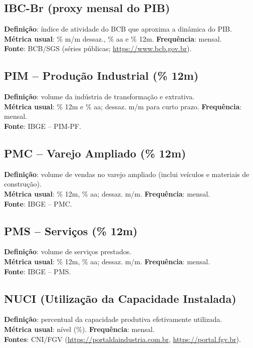 \documentclass[11pt,a4paper]{article}
\begin{document}
\subsection*{IBC-Br (proxy mensal do PIB)}
\textbf{Definição}: índice de atividade do BCB que aproxima a dinâmica do PIB.\\
\textbf{Métrica usual}: \% m/m dessaz., \% aa e \% 12m. \textbf{Frequência}: mensal.\\
\textbf{Fonte}: BCB/SGS (séries públicas; \url{https://www.bcb.gov.br}).

\subsection*{PIM -- Produção Industrial (\% 12m)}
\textbf{Definição}: volume da indústria de transformação e extrativa.\\
\textbf{Métrica usual}: \% 12m e \% aa; dessaz. m/m para curto prazo. \textbf{Frequência}: mensal.\\
\textbf{Fonte}: IBGE -- PIM-PF.

\subsection*{PMC -- Varejo Ampliado (\% 12m)}
\textbf{Definição}: volume de vendas no varejo ampliado (inclui veículos e materiais de construção).\\
\textbf{Métrica usual}: \% 12m, \% aa; dessaz. m/m. \textbf{Frequência}: mensal.\\
\textbf{Fonte}: IBGE -- PMC.

\subsection*{PMS -- Serviços (\% 12m)}
\textbf{Definição}: volume de serviços prestados.\\
\textbf{Métrica usual}: \% 12m, \% aa; dessaz. m/m. \textbf{Frequência}: mensal.\\
\textbf{Fonte}: IBGE -- PMS.

\subsection*{NUCI (Utilização da Capacidade Instalada)}
\textbf{Definição}: percentual da capacidade produtiva efetivamente utilizada.\\
\textbf{Métrica usual}: nível (\%). \textbf{Frequência}: mensal.\\
\textbf{Fontes}: CNI/FGV (\url{https://portaldaindustria.com.br}, \url{https://portal.fgv.br}).
\end{document}
